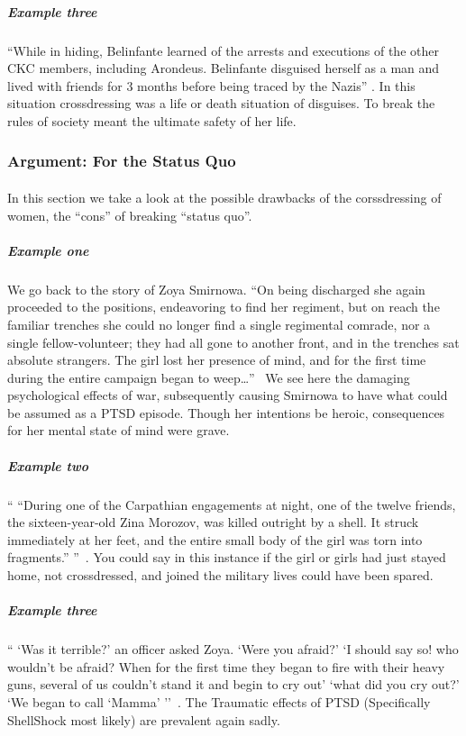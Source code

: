 \subparagraph{Example three}
``While in hiding, Belinfante learned of the arrests and executions of the other
CKC members, including Arondeus. Belinfante disguised herself as a man and lived
with friends for 3 months  before being traced by the Nazis''
\cite[t.~00:28:40-00:39:00]{BIWG}. In this situation crossdressing was a life or
death situation of disguises. To break the rules of society meant the ultimate
safety of her life.
\par

\subsubsection{Argument: For the Status Quo}

\paragraph{}
In this section we take a look at the possible drawbacks of the corssdressing of
women, the ``cons'' of breaking ``status quo''.

\subparagraph{Example one}
We go back to the story of Zoya Smirnowa. ``On being discharged she again
proceeded to the positions, endeavoring to find her regiment, but on reach the
familiar trenches she could no longer find a single regimental comrade, nor a
single fellow-volunteer; they had all gone to another front, and in the trenches
sat absolute strangers. The girl lost her presence of mind, and for the first
time during the entire campaign began to weep\ldots{}''~\cite[p.~367]{YGFRF} We see
here the damaging psychological effects of war, subsequently causing Smirnowa to
have what could be assumed as a PTSD episode. Though her intentions be heroic,
consequences for her mental state of mind were grave.
\par

\subparagraph{Example two}
`` ``During one of the Carpathian engagements at night, one of the twelve
friends, the sixteen-year-old Zina Morozov, was killed outright by a shell.
It struck immediately at her feet, and the entire small body of the girl was
torn into fragments.'' ''~\cite[p.~366]{YGFRF}. You could say in this instance if
the girl or girls had just stayed home, not crossdressed, and joined the
military lives could have been spared.
\par

\subparagraph{Example three}
`` `Was it terrible?' an officer asked Zoya. `Were you afraid?' `I should
say so! who wouldn't be afraid? When for the first time they began to fire with
their heavy guns, several of us couldn't stand it and begin to cry out' `what
did you cry out?' `We began to call `Mamma' ''~\cite[p.~366]{YGFRF}. The
Traumatic effects of PTSD (Specifically ShellShock most likely) are prevalent
again sadly.
\par

